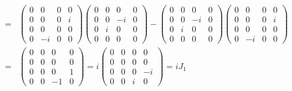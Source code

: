 \documentclass[11pt]{article}
\begin{document}
\begin{eqnarray}
    [J_2,J_3]&=&
    \begin{pmatrix}
        0 & 0 & 0 & 0 \\
        0 & 0 & 0 & i \\
        0 & 0 & 0 & 0 \\
        0 & -i & 0 & 0 
    \end{pmatrix}
    \begin{pmatrix}
        0 & 0 & 0 & 0 \\
        0 & 0 & -i & 0 \\
        0 & i & 0 & 0 \\
        0 & 0 & 0 & 0 
    \end{pmatrix}
    -
    \begin{pmatrix}
        0 & 0 & 0 & 0 \\
        0 & 0 & -i & 0 \\
        0 & i & 0 & 0 \\
        0 & 0 & 0 & 0 
    \end{pmatrix}
    \begin{pmatrix}
        0 & 0 & 0 & 0 \\
        0 & 0 & 0 & i \\
        0 & 0 & 0 & 0 \\
        0 & -i & 0 & 0 
    \end{pmatrix} \\ 
    &=& 
    \begin{pmatrix}
        0 & 0 & 0 & 0\\
        0 & 0 & 0 & 0 \\
        0 & 0 & 0 & 1 \\
        0 & 0 &-1 & 0
    \end{pmatrix}
    =i
    \begin{pmatrix}
        0 & 0 & 0 & 0\\
        0 & 0 & 0 & 0 \\
        0 & 0 & 0 & -i \\
        0 & 0 & i & 0
    \end{pmatrix}
    =iJ_1
\end{eqnarray}
\end{document}
